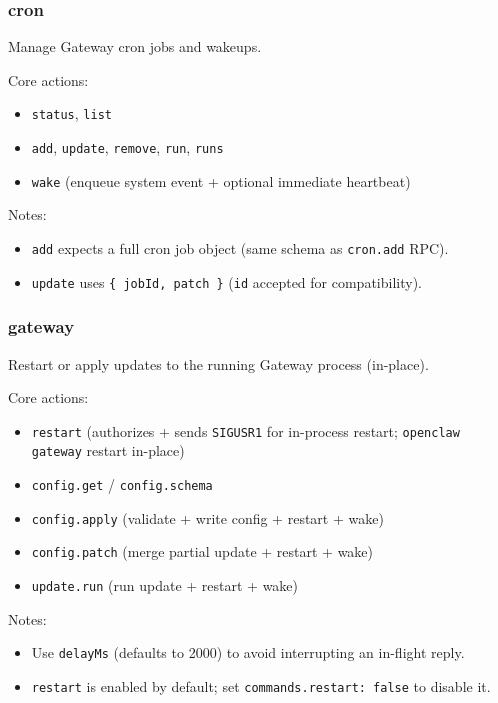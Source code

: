 \subsubsection{cron}


Manage Gateway cron jobs and wakeups.

Core actions:

\begin{itemize}
  \item \texttt{status}, \texttt{list}
  \item \texttt{add}, \texttt{update}, \texttt{remove}, \texttt{run}, \texttt{runs}
  \item \texttt{wake} (enqueue system event + optional immediate heartbeat)
\end{itemize}


Notes:

\begin{itemize}
  \item \texttt{add} expects a full cron job object (same schema as \texttt{cron.add} RPC).
  \item \texttt{update} uses \texttt{\{ jobId, patch \}} (\texttt{id} accepted for compatibility).
\end{itemize}


\subsubsection{gateway}


Restart or apply updates to the running Gateway process (in-place).

Core actions:

\begin{itemize}
  \item \texttt{restart} (authorizes + sends \texttt{SIGUSR1} for in-process restart; \texttt{openclaw gateway} restart in-place)
  \item \texttt{config.get} / \texttt{config.schema}
  \item \texttt{config.apply} (validate + write config + restart + wake)
  \item \texttt{config.patch} (merge partial update + restart + wake)
  \item \texttt{update.run} (run update + restart + wake)
\end{itemize}


Notes:

\begin{itemize}
  \item Use \texttt{delayMs} (defaults to 2000) to avoid interrupting an in-flight reply.
  \item \texttt{restart} is enabled by default; set \texttt{commands.restart: false} to disable it.
\end{itemize}


